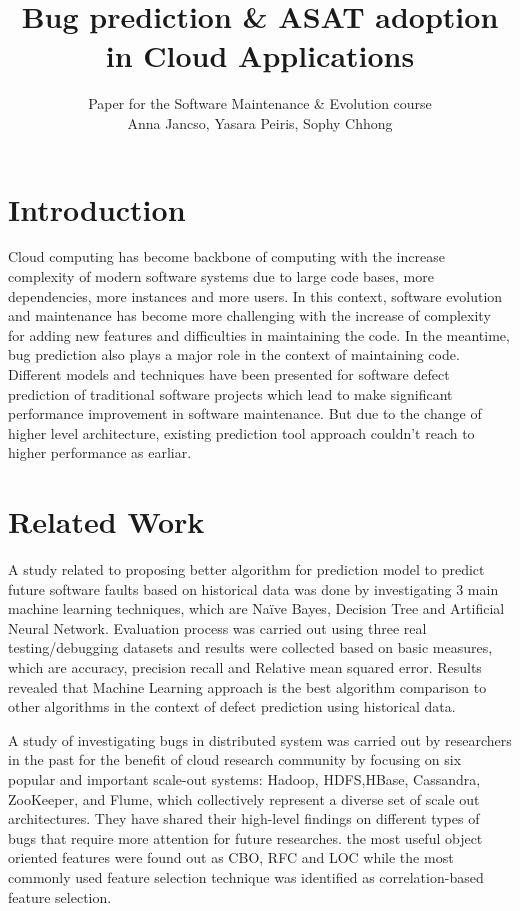 \documentclass{seal_article}
\title{Bug prediction \& ASAT adoption \\in Cloud Applications}
\subtitle{Paper for the Software Maintenance \& Evolution course \\ Anna Jancso, Yasara Peiris, Sophy Chhong}
\begin{document}
\maketitle

\section{Introduction}
Cloud computing has become backbone of computing  with the increase complexity of modern software systems due to large code bases, more dependencies, more instances and more users. In this context, software evolution and maintenance has become more challenging with the increase of complexity for adding new features and difficulties in maintaining the code. 
In the meantime, bug prediction also plays a major role in the context of maintaining code. Different models and techniques have been presented for software defect prediction of traditional software projects which lead to make significant performance improvement in software maintenance. But due to the change of higher level architecture, existing prediction tool approach couldn’t reach to higher performance as earliar.

\section{Related Work}
A study related to proposing better algorithm for prediction model to predict future software faults based on historical data was done by investigating 3 main machine learning techniques, which are Naïve Bayes, Decision Tree and Artificial Neural Network. Evaluation process was carried out using three real testing/debugging datasets and results were collected based on basic measures, which are accuracy, precision recall and Relative mean squared error. Results revealed that Machine Learning approach is the best algorithm comparison to other algorithms in the context of defect prediction using historical data. \cite{hammouri}

A study of investigating bugs in distributed system was carried out by researchers in the past for the benefit of cloud research community by focusing on six popular and important scale-out systems: Hadoop, HDFS,HBase, Cassandra, ZooKeeper, and Flume, which collectively represent a diverse set of scale out architectures. They  have shared their high-level findings on different types of bugs that require more attention for future researches. the most useful object oriented features were found out as CBO, RFC and LOC while the most commonly used feature selection technique was identified as correlation-based feature selection. \cite{gunawi}
\end{document}
